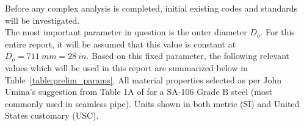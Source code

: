 \label{chapt:standards}

Before any complex analysis is completed, initial existing codes and standards will be investigated.\\

The most important parameter in question is the outer diameter $D_o$. For this entire report, it will be assumed that this value is constant at $D_o = 711\ mm = 28\ in$. Based on this fixed parameter, the following relevant values which will be used in this report are summarized below in Table~\ref{table:prelim_params}. All material properties selected as per John Umina's  suggestion from Table 1A of \cite{ASMEbvpcIID} for a SA-106 Grade B steel (most commonly used in seamless pipe). Units shown in both metric (SI) and United States customary (USC).\\

